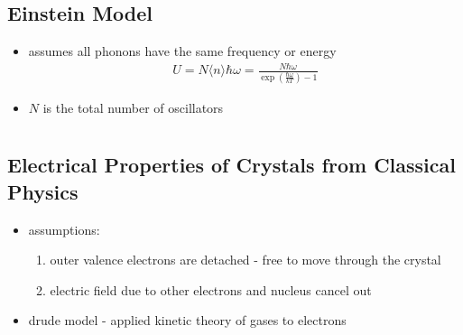 \documentclass[a4paper,11pt,normalem]{article}
\begin{document}
\subsection{Einstein Model}

\begin{itemize}
    \item assumes all phonons have the same frequency or energy
        \begin{align*}
            U = N\langle n\rangle\hbar\omega = \frac{N\hbar\omega}{\exp\left(\frac{\hbar\omega}{kT}\right) - 1}
        \end{align*}
    \item \(N\) is the total number of oscillators
\end{itemize}

\section{}

\subsection{Electrical Properties of Crystals from Classical Physics}

\begin{itemize}
    \item assumptions:
        \begin{enumerate}
            \item outer valence electrons are detached - free to move through the crystal
            \item electric field due to other electrons and nucleus cancel out
        \end{enumerate}
    \item drude model - applied kinetic theory of gases to electrons
\end{itemize}
\end{document}
